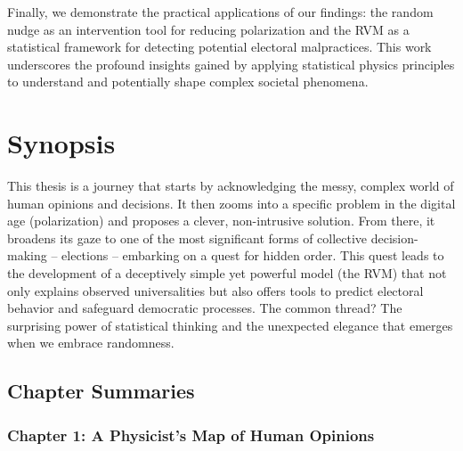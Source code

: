 Finally, we demonstrate the practical applications of our findings: the random nudge as an intervention tool for reducing polarization and the RVM as a statistical framework for detecting potential electoral malpractices. This work underscores the profound insights gained by applying statistical physics principles to understand and potentially shape complex societal phenomena.

\newpage

\chapter*{Synopsis}


This thesis is a journey that starts by acknowledging the messy, complex world of human opinions and decisions. It then zooms into a specific problem in the digital age (polarization) and proposes a clever, non-intrusive solution. From there, it broadens its gaze to one of the most significant forms of collective decision-making – elections – embarking on a quest for hidden order. This quest leads to the development of a deceptively simple yet powerful model (the RVM) that not only explains observed universalities but also offers tools to predict electoral behavior and safeguard democratic processes. The common thread? The surprising power of statistical thinking and the unexpected elegance that emerges when we embrace randomness.

\section*{Chapter Summaries}

\subsection*{Chapter 1: A Physicist's Map of Human Opinions}

